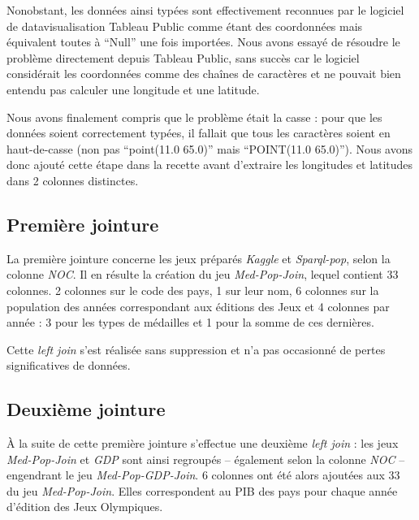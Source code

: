 \documentclass[hidelinks, 12pt]{report}
\begin{document}
Nonobstant, les données ainsi typées sont effectivement reconnues par le logiciel de datavisualisation Tableau Public comme étant des coordonnées mais équivalent toutes à \enquote{Null} une fois importées. Nous avons essayé de résoudre le problème directement depuis Tableau Public, sans succès car le logiciel considérait les coordonnées comme des chaînes de caractères et ne pouvait bien entendu pas calculer une longitude et une latitude.

Nous avons finalement compris que le problème était la casse : pour que les données soient correctement typées, il fallait que tous les caractères soient en haut-de-casse (non pas \enquote{point(11.0 65.0)} mais \enquote{POINT(11.0 65.0)}). Nous avons donc ajouté cette étape dans la recette avant d'extraire les longitudes et latitudes dans 2 colonnes distinctes.





%





\label{join}\subsection{Première jointure}

La première jointure concerne les jeux préparés \textit{Kaggle} et \textit{Sparql-pop}, selon la colonne \textit{NOC}. Il en résulte la création du jeu \textit{Med-Pop-Join}, lequel contient 33 colonnes. 2 colonnes sur le code des pays, 1 sur leur nom, 6 colonnes sur la population des années correspondant aux éditions des Jeux et 4 colonnes par année : 3 pour les types de médailles et 1 pour la somme de ces dernières.

Cette \textit{left join} s'est réalisée sans suppression et n'a pas occasionné de pertes significatives de données.





%





\subsection{Deuxième jointure}

À la suite de cette première jointure s'effectue une deuxième \textit{left join} : les jeux \textit{Med-Pop-Join} et \textit{GDP} sont ainsi regroupés -- également selon la colonne \textit{NOC} -- engendrant le jeu \textit{Med-Pop-GDP-Join}. 6 colonnes ont été alors ajoutées aux 33 du jeu \textit{Med-Pop-Join}. Elles correspondent au PIB des pays pour chaque année d'édition des Jeux Olympiques.
\end{document}
